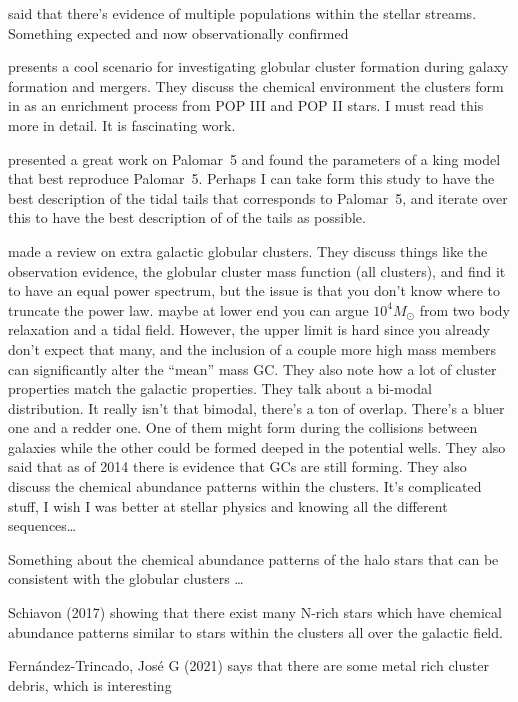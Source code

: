         \citet{2024MNRAS.529.2413U} said that there's evidence of multiple populations within the stellar streams. Something expected and now observationally confirmed     

        \citet{2025MNRAS.540.1235C} presents a cool scenario for investigating globular cluster formation during galaxy formation and mergers. They discuss the chemical environment the clusters form in as an enrichment process from POP III and POP II stars. I must read this more in detail. It is fascinating work. 

        \citet{2004AJ....127.2753D} presented a great work on Palomar~5 and found the parameters of a king model that best reproduce Palomar~5. Perhaps I can take form this study to have the best description of the tidal tails that corresponds to Palomar~5, and iterate over this to have the best description of of the tails as possible. 

        \citet{2006ARA&A..44..193B} made a review on extra galactic globular clusters. They discuss things like the observation evidence, the globular cluster mass function (all clusters), and find it to have an equal power spectrum, but the issue is that you don't know where to truncate the power law. maybe at lower end you can argue $10^4 M_\odot$ from two body relaxation and a tidal field. However, the upper limit is hard since you already don't expect that many, and the inclusion of a couple more high mass members can significantly alter the ``mean'' mass GC. They also note how a lot of cluster properties match the galactic properties. They talk about a bi-modal distribution. It really isn't that bimodal, there's a ton of overlap. There's a bluer one and a redder one. One of them might form during the collisions between galaxies while the other could be formed deeped in the potential wells. They also said that as of 2014 there is evidence that GCs are still forming. They also discuss the chemical abundance patterns within the clusters. It's complicated stuff, I wish I was better at stellar physics and knowing all the different sequences\dots

        Something about the chemical abundance patterns of the halo stars that can be consistent with the globular clusters \dots

        Schiavon (2017) showing that there exist many N-rich stars which have chemical abundance patterns similar to stars within the clusters all over the galactic field. 

        Fernández-Trincado, José G (2021) says that there are some metal rich cluster debris, which is interesting 

